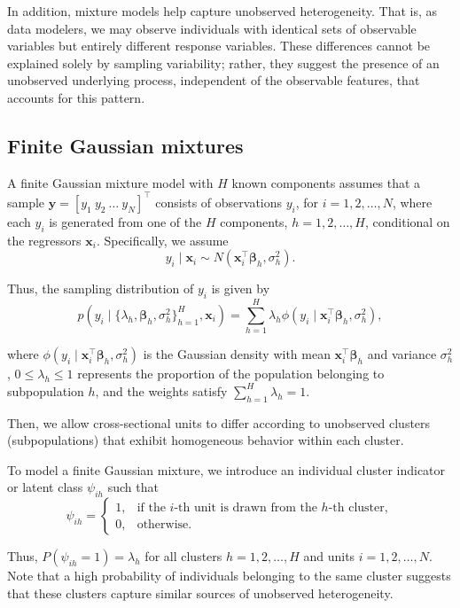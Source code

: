 In addition, mixture models help capture unobserved heterogeneity. That is, as data modelers, we may observe individuals with identical sets of observable variables but entirely different response variables. These differences cannot be explained solely by sampling variability; rather, they suggest the presence of an unobserved underlying process, independent of the observable features, that accounts for this pattern.

\subsection{Finite Gaussian mixtures}\label{sec11_11}
A finite Gaussian mixture model with \( H \) known components assumes that a sample 
\( \bm{y}=\left[y_1 \ y_2 \ \dots \ y_N\right]^{\top} \) consists of observations \( y_i \), 
for \( i=1,2,\dots,N \), where each \( y_i \) is generated from one of the \( H \) components, 
\( h=1,2,\dots,H \), conditional on the regressors \( \bm{x}_i \). Specifically, we assume  
\[
y_i \mid \bm{x}_i \sim N(\bm{x}_i^{\top}\bm{\beta}_h, \sigma_h^2).
\]

Thus, the sampling distribution of \( y_i \) is given by  
\[
p(y_i \mid \{\lambda_h, \bm{\beta}_h, \sigma_h^2\}_{h=1}^H, \bm{x}_i) = 
\sum_{h=1}^H \lambda_h \phi(y_i \mid \bm{x}_i^{\top}\bm{\beta}_h, \sigma_h^2),
\]

where \( \phi(y_i \mid \bm{x}_i^{\top}\bm{\beta}_h, \sigma_h^2) \) is the Gaussian density with mean 
\( \bm{x}_i^{\top}\bm{\beta}_h \) and variance \( \sigma_h^2 \), \( 0\leq \lambda_h\leq 1 \) represents 
the proportion of the population belonging to subpopulation \( h \), and the weights satisfy 
\( \sum_{h=1}^H \lambda_h = 1 \).

Then, we allow cross-sectional units to differ according to unobserved clusters (subpopulations) that exhibit homogeneous behavior within each cluster.

To model a finite Gaussian mixture, we introduce an individual cluster indicator or latent class \( \psi_{ih} \) such that  
\[
\psi_{ih}=
\begin{cases}
	1, & \text{if the } i\text{-th unit is drawn from the } h\text{-th cluster}, \\
	0, & \text{otherwise}.
\end{cases}
\]

Thus, \( P(\psi_{ih}=1) = \lambda_h \) for all clusters \( h=1,2,\dots,H \) and units \( i=1,2,\dots,N \). Note that a high probability of individuals belonging to the same cluster suggests that these clusters capture similar sources of unobserved heterogeneity.

